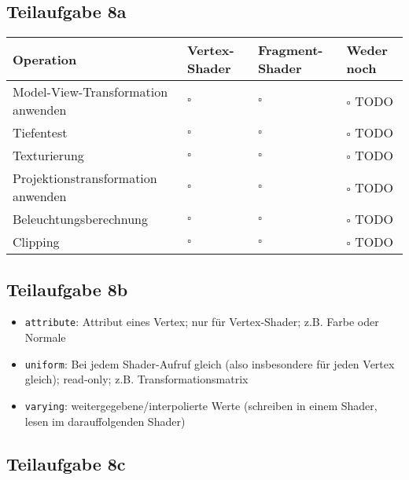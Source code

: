 \documentclass[a4paper]{scrartcl}
\begin{document}
\subsection*{Teilaufgabe 8a}
\begin{tabular}{p{8cm}p{1.5cm}p{1.5cm}p{1.5cm}}\toprule
Operation                          & Vertex-Shader & Fragment-Shader & Weder noch \\\midrule
Model-View-Transformation anwenden & $\square$     & $\square$       & $\square$ TODO\\ %
Tiefentest                         & $\square$     & $\square$       & $\square$ TODO\\
Texturierung                       & $\square$     & $\square$       & $\square$ TODO\\
Projektionstransformation anwenden & $\square$     & $\square$       & $\square$ TODO\\
Beleuchtungsberechnung             & $\square$     & $\square$       & $\square$ TODO\\
Clipping                           & $\square$     & $\square$       & $\square$ TODO\\\bottomrule
\end{tabular}

\subsection*{Teilaufgabe 8b}
\begin{itemize}
    \item \texttt{attribute}: Attribut eines Vertex; nur für Vertex-Shader; z.B. Farbe oder Normale
    \item \texttt{uniform}: Bei jedem Shader-Aufruf gleich (also insbesondere für jeden Vertex gleich); read-only; z.B. Transformationsmatrix
    \item \texttt{varying}: weitergegebene/interpolierte Werte (schreiben in einem Shader, lesen im darauffolgenden Shader)
\end{itemize}

\subsection*{Teilaufgabe 8c}
\inputminted[linenos, numbersep=5pt, tabsize=4, frame=lines, label=shader.vert]{glsl}{shader.vert}

\inputminted[linenos, numbersep=5pt, tabsize=4, frame=lines, label=shader.frag]{glsl}{shader.frag}
\end{document}
